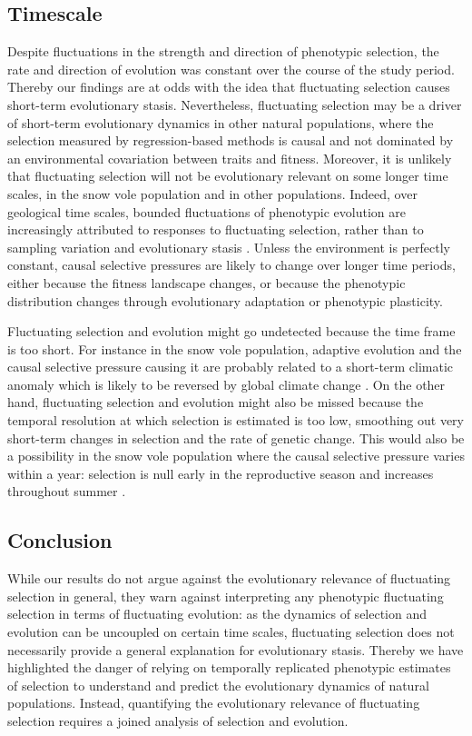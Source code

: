 \subsection*{Timescale} 
Despite fluctuations in the strength and direction of phenotypic selection, the rate and direction of evolution was constant over the course of the study period. Thereby our findings are at odds with the idea that fluctuating selection causes short-term evolutionary stasis. Nevertheless, fluctuating selection may be a driver of short-term evolutionary dynamics in other natural populations, where the selection measured by regression-based methods is causal and not dominated by an environmental covariation between traits and fitness. Moreover, it is unlikely that fluctuating selection will not be evolutionary relevant on some longer time scales, in the snow vole population and in other populations. Indeed, over geological time scales, bounded fluctuations of phenotypic evolution are increasingly attributed to responses to fluctuating selection, rather than to sampling variation and evolutionary stasis \parencite{Uyeda2011, Voje2015}. Unless the environment is perfectly constant, causal selective pressures are likely to change over longer time periods, either because the fitness landscape changes, or because the phenotypic distribution changes through evolutionary adaptation or phenotypic plasticity. 

Fluctuating selection and evolution might go undetected because the time frame is too short. For instance in the snow vole population, adaptive evolution and the causal selective pressure causing it are probably related to a short-term climatic anomaly which is likely to be reversed by global climate change \parencite{Bonnet2016}.
On the other hand, fluctuating selection and evolution might also be missed because the temporal resolution at which selection is estimated is too low, smoothing out very short-term changes in selection and the rate of genetic change. This would also be a possibility in the snow vole population where the causal selective pressure varies within a year: selection is null early in the reproductive season and increases throughout summer \parencite{Bonnet2016}. 

\subsection*{Conclusion} 

While our results do not argue against the evolutionary relevance of fluctuating selection in general, they warn against interpreting any phenotypic fluctuating selection in terms of fluctuating evolution: as the dynamics of selection and evolution can be uncoupled on certain time scales, fluctuating selection does not necessarily provide a general explanation for evolutionary stasis. Thereby we have highlighted the danger of relying on temporally replicated phenotypic estimates of selection to understand and predict the evolutionary dynamics of natural populations. Instead, quantifying the evolutionary relevance of fluctuating selection requires a joined analysis of selection and evolution.  


